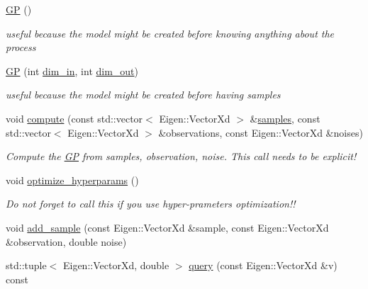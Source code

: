 \begin{DoxyCompactItemize}
\item 
\hyperlink{classlimbo_1_1model_1_1_g_p_aa18de82f231f3aed6ce8cce4c778aedb}{G\+P} ()
\begin{DoxyCompactList}\small\item\em useful because the model might be created before knowing anything about the process \end{DoxyCompactList}\item 
\hyperlink{classlimbo_1_1model_1_1_g_p_ab36947c89e4f5ad92599656a21829755}{G\+P} (int \hyperlink{classlimbo_1_1model_1_1_g_p_a41d99e6a69d53fc7d9260d295f787bc3}{dim\+\_\+in}, int \hyperlink{classlimbo_1_1model_1_1_g_p_a077144695f9f0b33b64d4feb8fb4e447}{dim\+\_\+out})
\begin{DoxyCompactList}\small\item\em useful because the model might be created before having samples \end{DoxyCompactList}\item 
void \hyperlink{classlimbo_1_1model_1_1_g_p_a5e2ea732c8d93491433fcc838f67f41e}{compute} (const std\+::vector$<$ Eigen\+::\+Vector\+Xd $>$ \&\hyperlink{classlimbo_1_1model_1_1_g_p_abaa15a2e503bac670dd1a35fb377aa23}{samples}, const std\+::vector$<$ Eigen\+::\+Vector\+Xd $>$ \&observations, const Eigen\+::\+Vector\+Xd \&noises)
\begin{DoxyCompactList}\small\item\em Compute the \hyperlink{classlimbo_1_1model_1_1_g_p}{G\+P} from samples, observation, noise. This call needs to be explicit! \end{DoxyCompactList}\item 
void \hyperlink{classlimbo_1_1model_1_1_g_p_aa01b41e37de4def676cf6c79b08aac94}{optimize\+\_\+hyperparams} ()
\begin{DoxyCompactList}\small\item\em Do not forget to call this if you use hyper-\/prameters optimization!! \end{DoxyCompactList}\item 
void \hyperlink{classlimbo_1_1model_1_1_g_p_a43e4e23d98c421d610df52ea6d3f3539}{add\+\_\+sample} (const Eigen\+::\+Vector\+Xd \&sample, const Eigen\+::\+Vector\+Xd \&observation, double noise)
\item 
std\+::tuple$<$ Eigen\+::\+Vector\+Xd, double $>$ \hyperlink{classlimbo_1_1model_1_1_g_p_a33937ff7df97c01fdd9bf8911e0a6159}{query} (const Eigen\+::\+Vector\+Xd \&v) const 
\item 

\end{DoxyCompactItemize}
